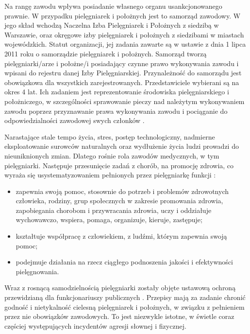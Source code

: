 \documentclass[a4paper,12pt,twoside,openright]{mwrep}
\begin{document}
Na rangę zawodu wpływa posiadanie własnego organu usankcjonowanego prawnie. W przypadku pielęgniarek i położnych jest to samorząd zawodowy. W jego skład wchodzą Naczelna Izba Pielęgniarek i Położnych z siedzibą w Warszawie, oraz okręgowe izby pielęgniarek i położnych z siedzibami w miastach wojewódzkich. Statut organizacji, jej zadania zawarte są w ustawie z dnia 1 lipca 2011 roku o samorządzie pielęgniarek i położnych. Samorząd tworzą pielęgniarki/arze i położne/i posiadający czynne prawo wykonywania zawodu i wpisani do rejestru danej Izby Pielęgniarskiej. Przynależność do samorządu jest obowiązkowa dla wszystkich zarejestrowanych. Przedstawiciele wybierani są na okres 4 lat. Ich zadaniem jest reprezentowanie środowiska pielęgniarskiego i położniczego, w szczególności sprawowanie pieczy nad należytym wykonywaniem zawodu poprzez przyznawanie prawa wykonywania zawodu i pociąganie do odpowiedzialności zawodowej swych członków \cite{nipip}.

Narastające stale tempo życia, stres, postęp technologiczny, nadmierne eksploatowanie surowców naturalnych oraz wydłużenie życia ludzi prowadzi do nieuniknionych zmian. Dlatego rośnie rola zawodów medycznych, w tym pielęgniarki. Następuje przesunięcie zadań z chorób, na promocję zdrowia, co wyraża się usystematyzowaniem pełnionych przez pielęgniarkę funkcji :
\begin{itemize}
	\item zapewnia swoją pomoc, stosownie do potrzeb i problemów zdrowotnych człowieka, rodziny, grup społecznych w zakresie promowania zdrowia, zapobiegania chorobom i przywracania zdrowia, uczy i oddziałuje wychowawczo, wspiera, pomaga, organizuje, kieruje, zastępuje;
	\item kształtuje współpracę z człowiekiem, z ludźmi, którym zapewnia swoją pomoc;
	\item podejmuje działania na rzecz ciągłego podnoszenia jakości i efektywności pielęgnowania.
\end{itemize}

Wraz z rosnącą samodzielnością pielęgniarki zostały objęte ustawową ochroną przewidzianą dla funkcjonariuszy publicznych \cite{prawo}. Przepisy mają za zadanie chronić godność i nietykalność cielesną pielęgniarek i położnych, w związku z pełnieniem przez nie obowiązków zawodowych. To jest niezwykle istotne, w świetle coraz częściej występujących incydentów agresji słownej i fizycznej.
\end{document}
